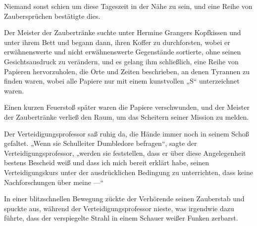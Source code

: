 Niemand sonst schien um diese Tageszeit in der Nähe zu sein, und eine Reihe von Zaubersprüchen bestätigte dies.

Der Meister der Zaubertränke suchte unter Hermine Grangers Kopfkissen und unter ihrem Bett und begann dann, ihren Koffer zu durchforsten, wobei er erwähnenswerte und nicht erwähnenswerte Gegenstände sortierte, ohne seinen Gesichtsausdruck zu verändern, und es gelang ihm schließlich, eine Reihe von Papieren hervorzuholen, die Orte und Zeiten beschrieben, an denen Tyrannen zu finden waren, wobei alle Papiere nur mit einem kunstvollen
„S“ unterzeichnet waren.

Einen kurzen Feuerstoß später waren die Papiere verschwunden, und der Meister der Zaubertränke verließ den Raum, um das Scheitern seiner Mission zu melden.

\later

Der Verteidigungsprofessor saß ruhig da, die Hände immer noch in seinem Schoß gefaltet.
„Wenn sie Schulleiter Dumbledore befragen“, sagte der Verteidigungsprofessor, „werden sie feststellen, dass er über diese Angelegenheit bestens Bescheid weiß und dass ich mich bereit erklärt habe, seinen Verteidigungskurs unter der ausdrücklichen Bedingung zu unterrichten, dass keine Nachforschungen über meine —“

In einer blitzschnellen Bewegung zückte der Verhörende seinen Zauberstab und spuckte  aus, während der Verteidigungsprofessor nieste, was irgendwie dazu führte, dass der verspiegelte Strahl in einem Schauer weißer Funken zerbarst.


